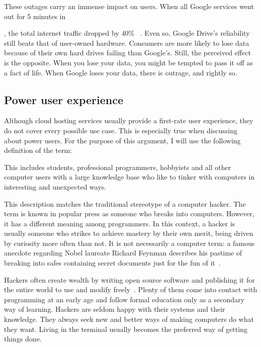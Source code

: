 These outages carry an immense impact on users. When all Google services went out for 5 minutes in \date{August 2013}, the total internet traffic dropped by 40\% ~\cite{google_goes_down_for_5_minutes}. Even so, Google Drive's reliability still beats that of user-owned hardware. Consumers are more likely to lose data because of their own hard drives failing than Google's. Still, the perceived effect is the opposite. When you lose your data, you might be tempted to pass it off as a fact of life. When Google loses your data, there is outrage, and rightly so.

\subsection{Power user experience} \label{power_user_experience}

Although cloud hosting services usually provide a first-rate user experience, they do not cover every possible use case. This is especially true when discussing about power users. For the purpose of this argument, I will use the following definition of the term:

\vspace{1em}
\noindent{}
\vspace{1em}

This includes students, professional programmers, hobbyists and all other computer users with a large knowledge base who like to tinker with computers in interesting and unexpected ways.

This description matches the traditional stereotype of a computer hacker. The term is known in popular press as someone who breaks into computers. However, it has a different meaning among programmers. In this context, a hacker is usually someone who strikes to achieve mastery by their own merit, being driven by curiosity more often than not. It is not necessarily a computer term: a famous anecdote regarding Nobel laureate Richard Feynman describes his pastime of breaking into safes containing secret documents just for the fun of it~\cite{feynman}.

Hackers often create wealth by writing open source software and publishing it for the entire world to use and modify freely~\cite{hackers_and_painters}. Plenty of them come into contact with programming at an early age and follow formal education only as a secondary way of learning. Hackers are seldom happy with their systems and their knowledge. They always seek new and better ways of making computers do what they want. Living in the terminal usually becomes the preferred way of getting things done.

